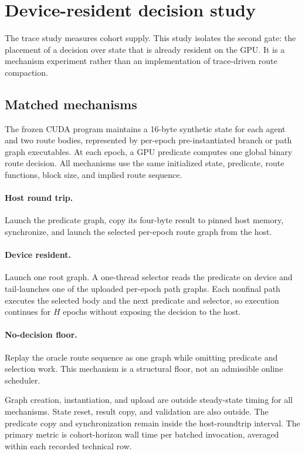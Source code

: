 \section{Device-resident decision study}
\label{sec:resident-method}

The trace study measures cohort supply. This study isolates the second gate:
the placement of a decision over state that is already resident on the GPU. It
is a mechanism experiment rather than an implementation of trace-driven route
compaction.

\subsection{Matched mechanisms}

The frozen CUDA program maintains a 16-byte synthetic state for each agent and
two route bodies, represented by per-epoch pre-instantiated branch or path graph
executables. At each epoch, a GPU predicate computes one global binary route
decision. All mechanisms use the same initialized state, predicate, route
functions, block size, and implied route sequence.

\paragraph{Host round trip.}
Launch the predicate graph, copy its four-byte result to pinned host memory,
synchronize, and launch the selected per-epoch route graph from the host.

\paragraph{Device resident.}
Launch one root graph. A one-thread selector reads the predicate on device and
tail-launches one of the uploaded per-epoch path graphs. Each nonfinal path
executes the selected body and the next predicate and selector, so execution
continues for $H$ epochs without exposing the decision to the host.

\paragraph{No-decision floor.}
Replay the oracle route sequence as one graph while omitting predicate and
selection work. This mechanism is a structural floor, not an admissible online
scheduler.

Graph creation, instantiation, and upload are outside steady-state timing for
all mechanisms. State reset, result copy, and validation are also outside. The
predicate copy and synchronization remain inside the host-roundtrip interval.
The primary metric is cohort-horizon wall time per batched invocation, averaged
within each recorded technical row.

